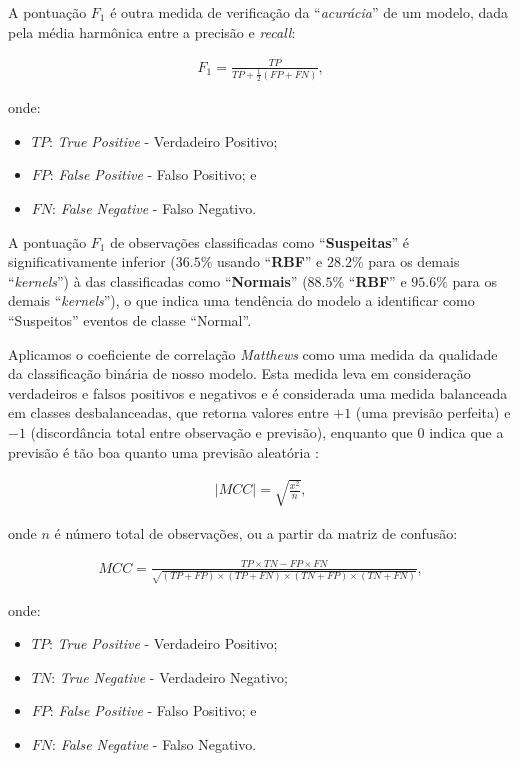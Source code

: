 \documentclass[twoside]{article}
\begin{document}
A pontuação $F_1$ é outra medida de verificação da ``\textit{acurácia}'' de um modelo, dada pela média harmônica entre a precisão e \textit{recall}:

\begin{align*}
    F_1 = \frac{TP}{TP + \frac{1}{2}(FP + FN)} \text{,}
\end{align*}

\noindent onde:

\begin{itemize}
    \item $TP$: \textit{True Positive} - Verdadeiro Positivo;
    \item $FP$: \textit{False Positive} - Falso Positivo; e
    \item $FN$: \textit{False Negative} - Falso Negativo.
\end{itemize}

A pontuação $F_1$ de observações classificadas como ``\textbf{Suspeitas}'' é significativamente inferior ($36.5\%$ usando ``\textbf{RBF}'' e $28.2\%$ para os demais ``\textit{kernels}'') à das classificadas como ``\textbf{Normais}'' ($88.5\%$ ``\textbf{RBF}'' e $95.6\%$ para os demais ``\textit{kernels}''), o que indica uma tendência do modelo a identificar como ``Suspeitos'' eventos de classe ``Normal''.

Aplicamos o coeficiente de correlação \textit{Matthews} como uma medida da qualidade da classificação binária de nosso modelo. Esta medida leva em consideração verdadeiros e falsos positivos e negativos e é considerada uma medida balanceada em classes desbalanceadas, que retorna valores entre $+1$ (uma previsão perfeita) e $-1$ (discordância total entre observação e previsão), enquanto que $0$ indica que a previsão é tão boa quanto uma previsão aleatória \cite{matthews1975comparison}:

\begin{align*}
    | MCC | = \sqrt{\frac{x^2}{n}} \text{,}
\end{align*}

\noindent onde $n$ é número total de observações, ou a partir da matriz de confusão:

\begin{align*}
    MCC = \frac{TP \times TN - FP \times FN}{\sqrt{(TP + FP) \times (TP + FN) \times (TN + FP) \times (TN + FN)}} \text{,}
\end{align*}

\noindent onde:

\begin{itemize}
    \item $TP$: \textit{True Positive} - Verdadeiro Positivo;
    \item $TN$: \textit{True Negative} - Verdadeiro Negativo;
    \item $FP$: \textit{False Positive} - Falso Positivo; e
    \item $FN$: \textit{False Negative} - Falso Negativo.
\end{itemize}
\end{document}
